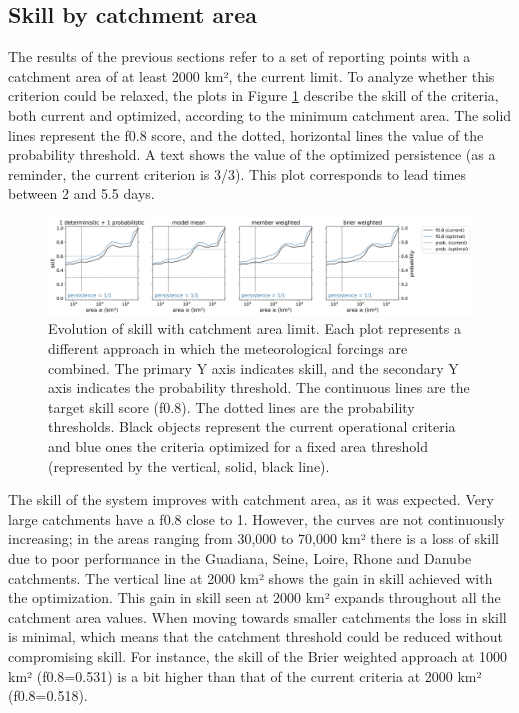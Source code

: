 \documentclass[preprint,12pt]{elsarticle}
\begin{document}
\subsection{Skill by catchment area}
\label{sec:skill_area}

The results of the previous sections refer to a set of reporting points with a catchment area of at least 2000 km², the current limit. To analyze whether this criterion could be relaxed, the plots in Figure \ref{fig:skill_area} describe the skill of the criteria, both current and optimized, according to the minimum catchment area. The solid lines represent the f0.8 score, and the dotted, horizontal lines the value of the probability threshold. A text shows the value of the optimized persistence (as a reminder, the current criterion is 3/3). This plot corresponds to lead times between 2 and 5.5 days.

\begin{figure}
    \centering
    \includegraphics[width=1\textwidth]{figures/skill_vs_area_2000km2_1239points_060h.jpg}
    \caption{Evolution of skill with catchment area limit. Each plot represents a different approach in which the meteorological forcings are combined. The primary Y axis indicates skill, and the secondary Y axis indicates the probability threshold. The continuous lines are the target skill score (f0.8). The dotted lines are the probability thresholds. Black objects represent the current operational criteria and blue ones the criteria optimized for a fixed area threshold (represented by the vertical, solid, black line).}
    \label{fig:skill_area}
\end{figure}

The skill of the system improves with catchment area, as it was expected. Very large catchments have a f0.8 close to 1. However, the curves are not continuously increasing; in the areas ranging from 30,000 to 70,000 km² there is a loss of skill due to poor performance in the Guadiana, Seine, Loire, Rhone and Danube catchments. The vertical line at 2000 km² shows the gain in skill achieved with the optimization. This gain in skill seen at 2000 km² expands throughout all the catchment area values. When moving towards smaller catchments the loss in skill is minimal, which means that the catchment threshold could be reduced without compromising skill. For instance, the skill of the Brier weighted approach at 1000 km² (f0.8=0.531) is a bit higher than that of the current criteria at 2000 km² (f0.8=0.518).
\end{document}
